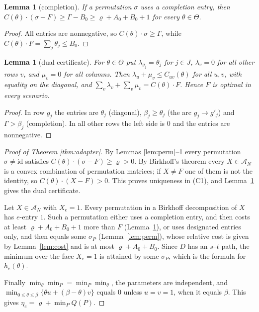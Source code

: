 \documentclass[11pt]{amsart}
\theoremstyle{plain}
\newtheorem{lemma}[theorem]{Lemma}
\theoremstyle{definition}
\theoremstyle{remark}
\newcommand{\cA}{\mathcal{A}}
\begin{document}
\begin{lemma}[completion]\label{lem:compl}
If a permutation $\sigma$ uses a completion entry, then $C(\theta)\cdot(\sigma-F)\ge\Gamma-B_0\ge\varrho+A_0+B_0+1$
for every $\theta\in\Theta$.
\end{lemma}
\begin{proof}
All entries are nonnegative, so $C(\theta)\cdot\sigma\ge\Gamma$, while $C(\theta)\cdot F=\sum_j\theta_j\le B_0$.
\end{proof}

\begin{lemma}[dual certificate]\label{lem:dual}
For $\theta\in\Theta$ put $\lambda_{g_j}=\theta_j$ for $j\in J$, $\lambda_v=0$ for all other rows $v$, and $\mu_v=0$ for
all columns. Then $\lambda_u+\mu_v\le C_{uv}(\theta)$ for all $u,v$, with equality on the diagonal, and
$\sum_v\lambda_v+\sum_v\mu_v=C(\theta)\cdot F$. Hence $F$ is optimal in every scenario.
\end{lemma}
\begin{proof}
In row $g_j$ the entries are $\theta_j$ (diagonal), $\beta_j\ge\theta_j$ (the arc $g_j\to g'_j$) and
$\Gamma>\beta_j$ (completion). In all other rows the left side is $0$ and the entries are nonnegative.
\end{proof}

\begin{proof}[Proof of Theorem \ref{thm:adapter}]
By Lemmas \ref{lem:perm}--\ref{lem:compl} every permutation $\sigma\ne\mathrm{id}$ satisfies
$C(\theta)\cdot(\sigma-F)\ge\varrho>0$. By Birkhoff's theorem every $X\in\cA_N$ is a convex combination of
permutation matrices; if $X\ne F$ one of them is not the identity, so $C(\theta)\cdot(X-F)>0$. This proves
uniqueness in (C1), and Lemma~\ref{lem:dual} gives the dual certificate.

Let $X\in\cA_N$ with $X_e=1$. Every permutation in a Birkhoff decomposition of $X$ has $e$-entry $1$. Such a
permutation either uses a completion entry, and then costs at least $\varrho+A_0+B_0+1$ more than $F$
(Lemma~\ref{lem:compl}), or uses designated entries only, and then equals some $\sigma_P$ (Lemma~\ref{lem:perm}),
whose relative cost is given by Lemma~\ref{lem:cost} and is at most $\varrho+A_0+B_0$. Since $D$ has an $s$--$t$
path, the minimum over the face $X_e=1$ is attained by some $\sigma_P$, which is the formula for $h_e(\theta)$.

Finally $\min_\theta\min_P=\min_P\min_\theta$, the parameters are independent, and
$\min_{0\le\theta\le\beta}\{\theta u+(\beta-\theta)v\}$ equals $0$ unless $u=v=1$, when it equals $\beta$. This gives
$\eta_e=\varrho+\min_PQ(P)$.
\end{proof}
\end{document}

